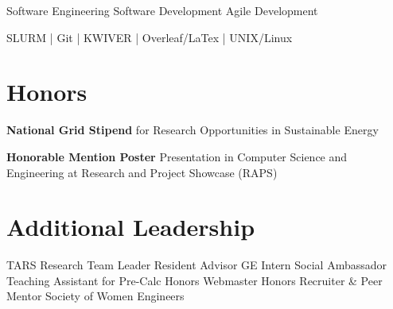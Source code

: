 \documentclass[]{resume-formatting}
\begin{document}
\begin{minipage}[t]{0.29\textwidth}
\sectionsep
{} \newline
Software Engineering \newline
Software Development \newline
Agile Development %
\sectionsep

 \newline
SLURM | Git | KWIVER |\newline
Overleaf/LaTex |\newline
UNIX/Linux 
\sectionsep


\section{Honors}
\textbf{National Grid Stipend} for Research Opportunities in Sustainable Energy
\sectionsep

\textbf{Honorable Mention Poster} Presentation in Computer Science and Engineering at Research and Project Showcase (RAPS)



\sectionsep


\section{Additional Leadership}
TARS Research Team Leader \newline
Resident Advisor \newline
GE Intern Social Ambassador
Teaching Assistant for Pre-Calc \newline
Honors Webmaster \newline
Honors Recruiter \& Peer Mentor \newline
Society of Women Engineers



\end{minipage} %
\end{document}
